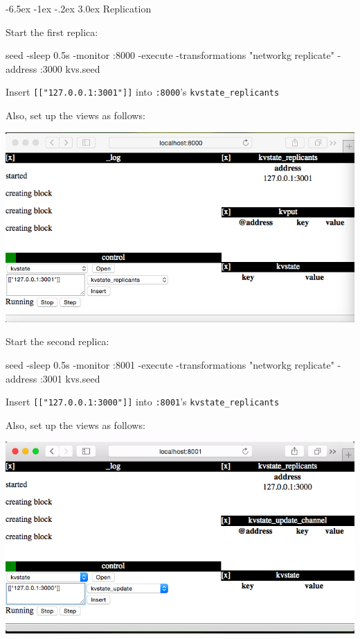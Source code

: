 \documentclass[a5paper,12pt,onecolumn]{article}
\makeatletter
\def\code#1{\mbox{\lstinline{#1}}}
\renewcommand\section{\@startsection {section}{1}{\z@}%
	{-6.5ex \@plus -1ex \@minus -.2ex}%
	{3.0ex}%
	{\sf\Large}}
\makeatother
\begin{document}
\section{Replication}

Start the first replica:

\begin{cli}
seed -sleep 0.5s -monitor :8000 -execute -transformations "networkg  replicate" -address :3000 kvs.seed
\end{cli}

Insert \code{[["127.0.0.1:3001"]]} into \code{:8000}'s \code{kvstate_replicants}

Also, set up the views as follows:

\includegraphics{replicate/first.png}

Start the second replica:

\begin{cli}
seed -sleep 0.5s -monitor :8001 -execute -transformations "networkg  replicate" -address :3001 kvs.seed
\end{cli}

Insert \code{[["127.0.0.1:3000"]]} into \code{:8001}'s \code{kvstate_replicants}

Also, set up the views as follows:

\includegraphics{replicate/second.png}
\end{document}
